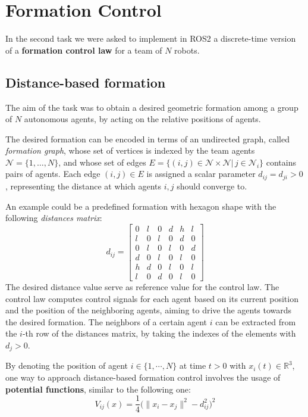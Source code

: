\documentclass[a4paper,11pt,oneside]{book}
\begin{document}
\chapter{Formation Control} 
 In the second task we were asked to implement in ROS2 a discrete-time version of a \textbf{formation control law} for a team of $N$ robots.

\section{Distance-based formation}
The aim of the task was to obtain a desired geometric formation among a group of $N$ autonomous agents, by acting on the relative positions of agents.

\bigskip
The desired formation can be encoded in terms of an undirected graph, called \textit{formation graph}, whose set of vertices is indexed by the team agents $\mathcal{N} =\{ 1, \ldots, N\}$, and whose set of edges $E=\{(i,j) \in \mathcal{N} \times \mathcal{N} | \, j \in \mathcal{N}_i\}$ contains pairs of agents. Each edge $(i,j) \in E$ is assigned a scalar parameter $d_{ij} = d_{ji} > 0$, representing the distance at which agents $i,j$ should converge to. 

An example could be a predefined formation with hexagon shape with the following \textit{distances matrix}:
\begin{equation}
d_{ij} =
\begin{bmatrix}
0 & l & 0 & d & h & l \\
l & 0 & l & 0 & d & 0 \\
0 & l & 0 & l & 0 & d \\
d & 0 & l & 0 & l & 0 \\
h & d & 0 & l & 0 & l \\
l & 0 & d & 0 & l & 0
\end{bmatrix}
\end{equation}
The desired distance value serve as reference value for the control law. The control law computes control signals for each agent based on its current position and the position of the neighboring agents, aiming to drive the agents towards the desired formation.
The neighbors of a certain agent $i$ can be extracted from the $i$-th row of the distances matrix, by taking the indexes of the elements with $d_j > 0$.

By denoting the position of agent $i \in \{1, \cdots, N\}$ at time $t>0$ with $x_i(t) \in \mathbb{R}^3$, one way to approach distance-based formation control involves the usage of \textbf{potential functions}, similar to the following one:
\begin{equation}
V_{ij}(x)  = \frac{1}{4} \bigg( \lVert x_i - x_j \rVert^2 - d_{ij}^2 \bigg)^2
\label{Formation_potential}
\end{equation}
\end{document}
